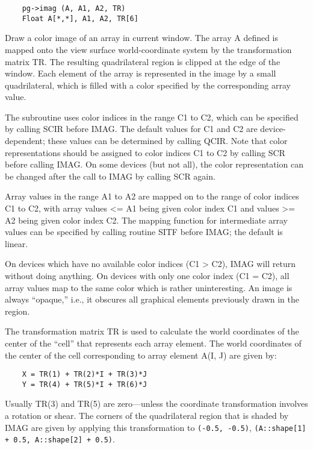 \begin{verbatim}
    pg->imag (A, A1, A2, TR)
    Float A[*,*], A1, A2, TR[6]
\end{verbatim}

Draw a color image of an array in current window.  The array A defined
is mapped onto the view surface world-coordinate system by the
transformation matrix TR.  The resulting quadrilateral region is
clipped at the edge of the window.  Each element of the array is
represented in the image by a small quadrilateral, which is filled
with a color specified by the corresponding array value.

The subroutine uses color indices in the range C1 to C2, which can be
specified by calling SCIR before IMAG.  The default values for C1 and
C2 are device-dependent; these values can be determined by calling
QCIR.  Note that color representations should be assigned to color
indices C1 to C2 by calling SCR before calling IMAG.  On some devices
(but not all), the color representation can be changed after the call
to IMAG by calling SCR again.

Array values in the range A1 to A2 are mapped on to the range of color
indices C1 to C2, with array values <= A1 being given color index C1
and values >= A2 being given color index C2.  The mapping function for
intermediate array values can be specified by calling routine SITF
before IMAG; the default is linear.

On devices which have no available color indices (C1 > C2), IMAG will
return without doing anything.  On devices with only one color index
(C1 = C2), all array values map to the same color which is rather
uninteresting.  An image is always ``opaque,'' i.e., it obscures all
graphical elements previously drawn in the region.

The transformation matrix TR is used to calculate the world
coordinates of the center of the ``cell'' that represents each array
element.  The world coordinates of the center of the cell
corresponding to array element A(I, J) are given by:

\begin{verbatim}
    X = TR(1) + TR(2)*I + TR(3)*J
    Y = TR(4) + TR(5)*I + TR(6)*J
\end{verbatim}

Usually TR(3) and TR(5) are zero---unless the coordinate
transformation involves a rotation or shear.  The corners of the
quadrilateral region that is shaded by IMAG are given by applying this
transformation to {\tt (-0.5, -0.5)}, {\tt (A::shape[1] + 0.5,
A::shape[2] + 0.5)}.

